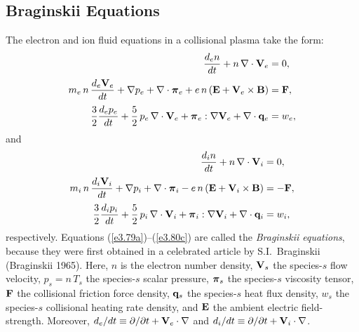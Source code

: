 \documentclass[notitlepage,12pt]{article}
\newcommand{\bpi}{\mbox{\boldmath$\pi$}}
\begin{document}
\subsection{Braginskii Equations}\label{sbrag}
The electron and ion fluid equations in a collisional plasma
take the form:
\begin{align}\label{e3.79a}
\frac{d_en}{dt} + n\,\nabla\cdot{\bf V}_e &= 0,\\[0.5ex]
m_e \,n\,\frac{d_e {\bf V}_e}{dt} + \nabla p_e+ \nabla\cdot \bpi_e + e\, n\,
({\bf E} + {\bf V}_e\times {\bf B})& = {\bf F},\label{e3.79b}\\[0.5ex]
\frac{3}{2}\frac{d_e p_e}{dt} + \frac{5}{2}\,p_e\,\nabla\cdot{\bf V}_e
+ \bpi_e:\nabla{\bf V}_e+ \nabla\cdot{\bf q}_e &= w_e,\label{e3.79c}
\end{align}
and
\begin{align}\label{e3.80a}
\frac{d_i n}{dt} + n\,\nabla\cdot{\bf V}_i &= 0,\\[0.5ex]
m_i \,n\,\frac{d_i {\bf V}_i}{dt} + \nabla p_i + \nabla\cdot \bpi_i - e\, n\,
({\bf E} + {\bf V}_i\times {\bf B})& =- {\bf F},\label{e3.80b}\\[0.5ex]
\frac{3}{2}\frac{d_i p_i}{dt} + \frac{5}{2}\,p_i\,\nabla\cdot{\bf V}_i
+ \bpi_i:\nabla{\bf V}_i+ \nabla\cdot{\bf q}_i &= w_i,\label{e3.80c}
\end{align}
respectively. 
Equations (\ref{e3.79a})--(\ref{e3.80c})  are called the {\em Braginskii equations}, because they were first obtained
in a celebrated article by S.I.~Braginskii (Braginskii 1965). Here, $n$ is the electron number density, ${\bf V}_s$ the species-$s$ flow velocity, $p_s=n\,T_s$ the 
species-$s$ scalar
pressure, $\bpi_s$ the species-$s$ viscosity tensor, ${\bf F}$ the collisional friction force density, ${\bf q}_s$  the species-$s$ heat flux density, $w_s$ the species-$s$ collisional heating rate density, and ${\bf E}$  the ambient electric field-strength. Moreover, $d_e/dt\equiv \partial/\partial t + {\bf V}_e\cdot\nabla$ and   $d_i/dt\equiv \partial/\partial t + {\bf V}_i\cdot\nabla$. 
\end{document}
